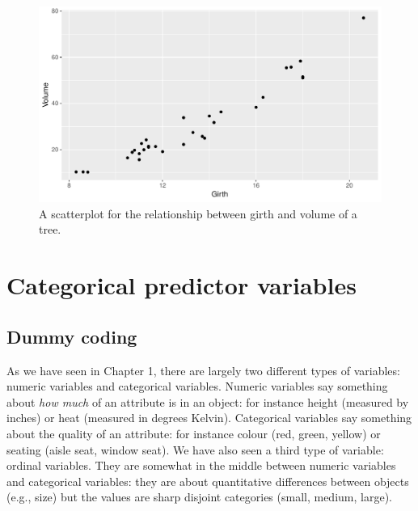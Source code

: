 \documentclass[]{book}\usepackage[]{graphicx}\usepackage[]{color}
\makeatletter
\def\maxwidth{ %
  \ifdim\Gin@nat@width>\linewidth
    \linewidth
  \else
    \Gin@nat@width
  \fi
}
\newenvironment{knitrout}{}{} %
\makeatother
\begin{document}
\begin{knitrout}
\color{fgcolor}\begin{figure}

{\centering \includegraphics[width=\maxwidth]{figure/multi_8-1} 

}

\caption[A scatterplot for the relationship between girth and volume of a tree]{A scatterplot for the relationship between girth and volume of a tree.}\label{fig:multi_8}
\end{figure}


\end{knitrout}





\chapter{Categorical predictor variables}\label{chap:categorical}



\section{Dummy coding}
As we have seen in Chapter 1, there are largely two different types of variables: numeric variables and categorical variables. Numeric variables say something about \textit{how much} of an attribute is in an object: for instance height (measured by inches) or heat (measured in degrees Kelvin). Categorical variables say something about the quality of an attribute: for instance colour (red, green, yellow) or seating (aisle seat, window seat). We have also seen a third type of variable: ordinal variables. They are somewhat in the middle between numeric variables and categorical variables: they are about quantitative differences between objects (e.g., size) but the values are sharp disjoint categories (small, medium, large).
\end{document}
